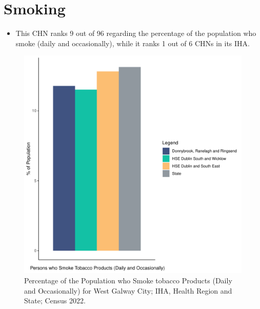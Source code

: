 \documentclass{article}
\begin{document}
\pagebreak

\section{Smoking}\label{sect:Smoking}
\begin{itemize}
\item This CHN ranks  9 out of 96 regarding the percentage of the population who smoke (daily and occasionally), while it ranks   1 out of 6 CHNs in its IHA.
\end{itemize}
\begin{figure}[H]
	\centering
	\includegraphics[width = 120mm]{../figures/SmokingED.pdf}
	\caption{Percentage of the Population who Smoke tobacco Products (Daily and Occasionally) for West Galway City; IHA, Health Region and State; Census 2022.}
	\label{fig:2ae19629-1a6a-13a3-e055-000000000001}
	\end{figure}
	
\end{document}
